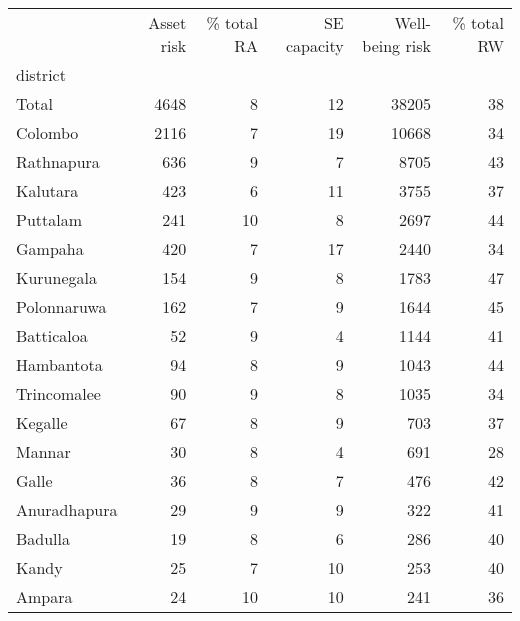 \begin{tabular}{lrrrrr}
\toprule
{} &  Asset risk &  \% total RA &  SE capacity &  Well-being risk &  \% total RW \\
district     &             &             &              &                  &             \\
\midrule
Total        &        4648 &           8 &           12 &            38205 &          38 \\
Colombo      &        2116 &           7 &           19 &            10668 &          34 \\
Rathnapura   &         636 &           9 &            7 &             8705 &          43 \\
Kalutara     &         423 &           6 &           11 &             3755 &          37 \\
Puttalam     &         241 &          10 &            8 &             2697 &          44 \\
Gampaha      &         420 &           7 &           17 &             2440 &          34 \\
Kurunegala   &         154 &           9 &            8 &             1783 &          47 \\
Polonnaruwa  &         162 &           7 &            9 &             1644 &          45 \\
Batticaloa   &          52 &           9 &            4 &             1144 &          41 \\
Hambantota   &          94 &           8 &            9 &             1043 &          44 \\
Trincomalee  &          90 &           9 &            8 &             1035 &          34 \\
Kegalle      &          67 &           8 &            9 &              703 &          37 \\
Mannar       &          30 &           8 &            4 &              691 &          28 \\
Galle        &          36 &           8 &            7 &              476 &          42 \\
Anuradhapura &          29 &           9 &            9 &              322 &          41 \\
Badulla      &          19 &           8 &            6 &              286 &          40 \\
Kandy        &          25 &           7 &           10 &              253 &          40 \\
Ampara       &          24 &          10 &           10 &              241 &          36 \\

\end{tabular}
